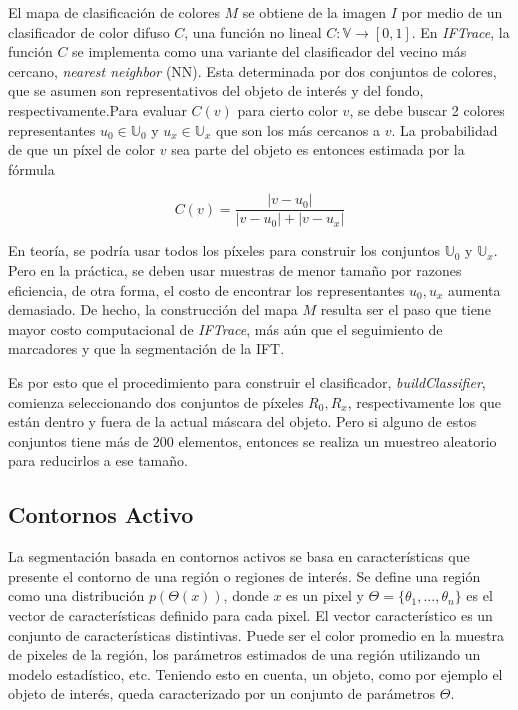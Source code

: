 \documentclass[a4paper,10pt]{article}
\begin{document}
El mapa de clasificación de colores $M$ se obtiene de la imagen $I$ por medio de un
clasificador de color difuso $C$, una función no lineal $C : \mathbb{V} \to [0,1]$.
En \textit{IFTrace}, la función $C$ se implementa como una variante del clasificador
del vecino más cercano, \textit{nearest neighbor} (NN). Esta determinada por dos conjuntos de
colores, que se asumen son representativos del objeto de interés y del fondo, respectivamente.Para evaluar $C(v)$ para
cierto color $v$, se debe buscar 2 colores representantes $u_{0} \in \mathbb{U}_{0}$
y $u_{x} \in \mathbb{U}_{x}$ que son los más cercanos a $v$.
La probabilidad de que un píxel de color $v$ sea parte del objeto es entonces estimada
por la fórmula

\begin{equation}
   \label{eq:IFTrace-color-classifier}
   C(v) = \frac{|v - u_{0}|}{|v - u_{0}| + |v - u_{x}|}
\end{equation}

En teoría, se podría usar todos los píxeles para construir los conjuntos
$\mathbb{U}_{0}$ y $\mathbb{U}_{x}$. Pero en la práctica, se deben usar muestras
de menor tamaño por razones eficiencia, de otra forma, el costo de encontrar los
representantes $u_{0},u_{x}$ aumenta demasiado. De hecho, la construcción del mapa
$M$ resulta ser el paso que tiene mayor costo computacional de \textit{IFTrace}, más
aún que el seguimiento de marcadores y que la segmentación de la IFT.

Es por esto que el procedimiento para construir el clasificador,
\textit{buildClassifier}, comienza seleccionando dos conjuntos de píxeles
$R_{0},R_{x}$, respectivamente los que están dentro y fuera de la actual máscara
del objeto. Pero si alguno de estos conjuntos tiene más de 200 elementos,
entonces se realiza un muestreo aleatorio para reducirlos a ese tamaño.

\subsection{Contornos Activo}

La segmentación basada en contornos activos se basa en características
que presente el contorno de una región o regiones de interés. Se define una
región como una distribución $p(\Theta(x))$, donde $x$ es un pixel y $\Theta =
\{\theta_{1}, ..., \theta_{n}\}$ es el vector de características definido para
cada pixel. El vector característico es un conjunto de características
distintivas. Puede ser el color promedio en la muestra de pixeles de la región,
los parámetros estimados de una región utilizando un modelo estadístico, etc.
Teniendo esto en cuenta, un objeto, como por ejemplo el objeto de interés,
queda caracterizado por un conjunto de parámetros $\Theta$.
\end{document}
